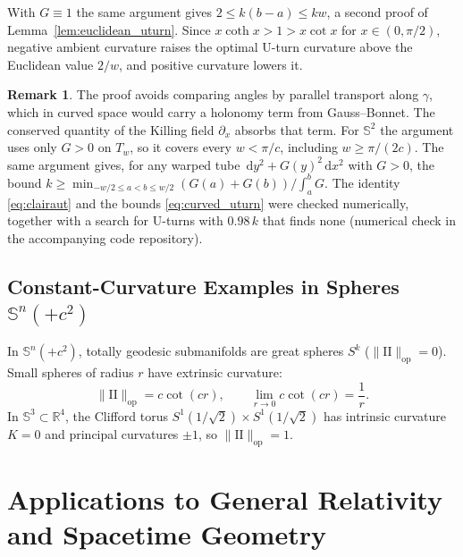 \documentclass[11pt,reqno]{amsart}
\theoremstyle{definition}
\newtheorem{remark}[theorem]{Remark}
\providecommand{\R}{\mathbb{R}}
\providecommand{\Sph}{\mathbb{S}}
\providecommand{\II}{\mathrm{I\!I}}
\newcommand{\op}{\mathrm{op}}
\providecommand{\dif}{\,\mathrm{d}}
\numberwithin{equation}{section}
\providecommand{\Sph}{\mathbb{S}}
\providecommand{\II}{\mathrm{II}}
\providecommand{\R}{\mathbb{R}}
\begin{document}
With $G \equiv 1$ the same argument gives $2 \le k(b - a) \le kw$, a second proof of Lemma~\ref{lem:euclidean_uturn}. Since $x\coth x > 1 > x\cot x$ for $x \in (0,\pi/2)$, negative ambient curvature raises the optimal U-turn curvature above the Euclidean value $2/w$, and positive curvature lowers it.

\begin{remark}
The proof avoids comparing angles by parallel transport along $\gamma$, which in curved space would carry a holonomy term from Gauss--Bonnet. The conserved quantity of the Killing field $\partial_x$ absorbs that term. For $\Sph^2$ the argument uses only $G > 0$ on $T_w$, so it covers every $w < \pi/c$, including $w \ge \pi/(2c)$. The same argument gives, for any warped tube $\dif y^2 + G(y)^2\dif x^2$ with $G > 0$, the bound $k \ge \min_{-w/2 \le a < b \le w/2} (G(a) + G(b))/\int_a^b G$. The identity \eqref{eq:clairaut} and the bounds \eqref{eq:curved_uturn} were checked numerically, together with a search for U-turns with $0.98\,k$ that finds none (numerical check in the accompanying code repository).
\end{remark}

\subsection{Constant-Curvature Examples in Spheres \texorpdfstring{$\Sph^n(+c^2)$}{S\textasciicircum n(+c\textasciicircum 2)}}
In $\Sph^n(+c^2)$, totally geodesic submanifolds are great spheres $S^k$ ($\|\II\|_{\op} = 0$). Small spheres of radius $r$ have extrinsic curvature:
\begin{equation}
\|\II\|_{\op} = c \cot(c r), \qquad \lim_{r \to 0} c\cot(cr) = \frac{1}{r}.
\end{equation}
In $\Sph^3 \subset \R^4$, the Clifford torus $S^1(1/\sqrt{2}) \times S^1(1/\sqrt{2})$ has intrinsic curvature $K = 0$ and principal curvatures $\pm 1$, so $\|\II\|_{\op} = 1$.

\section{Applications to General Relativity and Spacetime Geometry}
\end{document}

